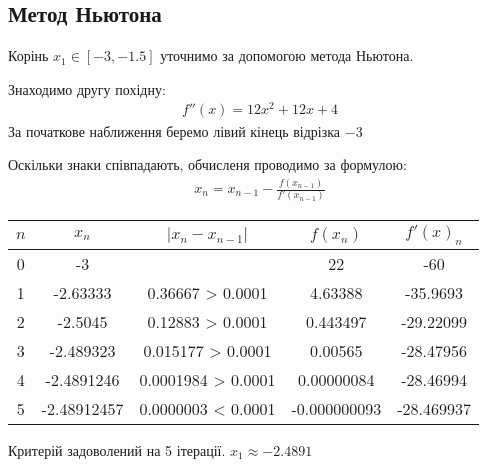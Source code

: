 \subsection{Метод Ньютона}
\label{subsec:task1_newton}

Корінь $x_1 \in [-3, -1.5]$ уточнимо
за допомогою метода Ньютона.

Знаходимо другу похідну:
\begin{align}
    f''(x) = 12x^2 + 12x + 4
\end{align}
За початкове наближення беремо лівий кінець відрізка $-3$

Оскільки знаки співпадають, обчисленя проводимо за формулою:
\begin{align}
    x_n = x_{n - 1} - \frac{f(x_{n - 1})}{f'(x_{n - 1})}
\end{align}

\begin{tabular}{|c|c|c|c|c|}
    \toprule
    $n$ & $x_n$       & $|x_n - x_{n - 1}|$ & $f(x_n)$     & $f'(x)_n$  \\

    \midrule
    0   & -3          &                     & 22           & -60        \\
    \hline
    1   & -2.63333    & 0.36667    > 0.0001 & 4.63388      & -35.9693   \\
    \hline
    2   & -2.5045     & 0.12883    > 0.0001 & 0.443497     & -29.22099  \\
    \hline
    3   & -2.489323   & 0.015177   > 0.0001 & 0.00565      & -28.47956  \\
    \hline
    4   & -2.4891246  & 0.0001984  > 0.0001 & 0.00000084   & -28.46994  \\
    \hline
    5   & -2.48912457 & 0.0000003  < 0.0001 & -0.000000093 & -28.469937 \\

    \bottomrule
\end{tabular}

Критерій задоволений на 5 ітерації. $x_1 \approx -2.4891$
